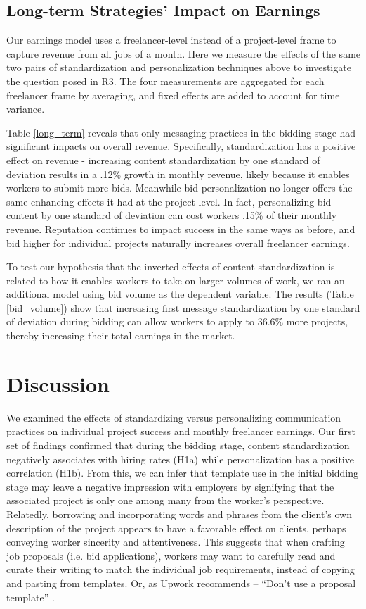 

\subsection{{Long-term Strategies' Impact on Earnings}}
Our earnings model uses a freelancer-level instead of a project-level {frame} to capture revenue from all jobs of a month. Here we measure the effects of the same two pairs of standardization and personalization techniques above {to investigate the question posed in R3}. The four measurements are aggregated for each freelancer {frame} by averaging, and fixed effects are added to account for time variance. 

Table \cref{long_term} reveals that only messaging practices in the bidding stage had significant impacts on overall revenue. Specifically, standardization has a positive effect on revenue {- increasing content standardization by one standard of deviation results in a .12\% growth in monthly revenue,} likely because it enables workers to submit more bids. {Meanwhile} bid personalization no longer offers the same enhancing effects it had at the project level. {In fact, personalizing bid content by one standard of deviation can cost workers .15\% of their monthly revenue}. Reputation continues to impact success in the same ways as before, and bid higher for individual projects naturally increases overall freelancer earnings.

{To test our hypothesis that the inverted effects of content standardization is related to how} it enables workers to take on larger volumes of work, we ran an additional model using bid volume as the dependent variable. {The results (Table \cref{bid_volume}) show that increasing first message standardization by one standard of deviation} during bidding {can allow workers to apply to 36.6\% more projects}, {thereby} increasing their total earnings in the market.



\section{Discussion}
We examined the effects of standardizing versus personalizing communication practices on individual project success and monthly freelancer earnings. Our first set of findings confirmed that during the bidding stage, content standardization negatively associates with hiring rates {(H1a)} while personalization has a positive {correlation (H1b)}. From this, we can infer that template use in the initial bidding stage may leave a negative impression with employers by signifying that the associated project is only one among many from the worker's perspective. Relatedly, borrowing and incorporating words and phrases from the client's own description of the project appears to have a favorable effect on clients, perhaps conveying worker sincerity and attentiveness. This suggests that when crafting job proposals (i.e. bid applications), workers may want to carefully read and curate their writing to match the individual job requirements, instead of copying and pasting from templates. Or, as Upwork recommends -- ``Don't use a proposal template'' \cite{noauthor_undated-wy}.

